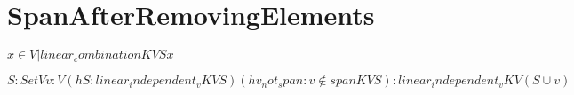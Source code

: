\section{SpanAfterRemovingElements}

\begin{definition}
  \label{definition : span}
  \leanok
  ${ x \in V | linear_combination K V S x }$
\end{definition}

\begin{theorem}
  \label{theorem : linear_independent_insert_of_not_in_span}
  \leanok
  ${S : Set V} {v : V}
  (hS : linear_independent_v K V S)
  (hv_not_span : v \notin span K V S):
  linear_independent_v K V (S ∪ {v})$
\end{theorem}
